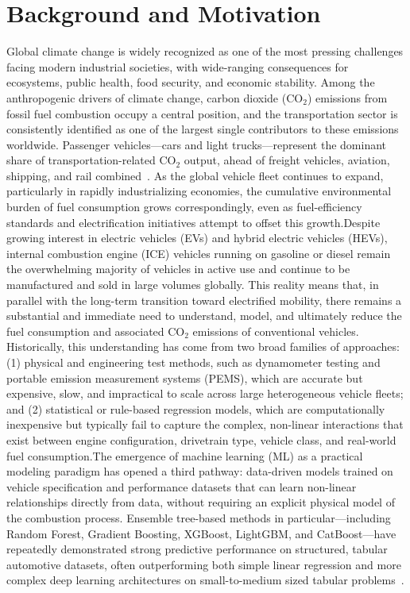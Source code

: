 \section{Background and Motivation}

Global climate change is widely recognized as one of the most pressing challenges facing modern industrial societies, with wide-ranging consequences for ecosystems, public health, food security, and economic stability. Among the anthropogenic drivers of climate change, carbon dioxide (CO$_2$) emissions from fossil fuel combustion occupy a central position, and the transportation sector is consistently identified as one of the largest single contributors to these emissions worldwide. Passenger vehicles---cars and light trucks---represent the dominant share of transportation-related CO$_2$ output, ahead of freight vehicles, aviation, shipping, and rail combined~\cite{atique2026explainable}. As the global vehicle fleet continues to expand, particularly in rapidly industrializing economies, the cumulative environmental burden of fuel consumption grows correspondingly, even as fuel-efficiency standards and electrification initiatives attempt to offset this growth.Despite growing interest in electric vehicles (EVs) and hybrid electric vehicles (HEVs), internal combustion engine (ICE) vehicles running on gasoline or diesel remain the overwhelming majority of vehicles in active use and continue to be manufactured and sold in large volumes globally. This reality means that, in parallel with the long-term transition toward electrified mobility, there remains a substantial and immediate need to understand, model, and ultimately reduce the fuel consumption and associated CO$_2$ emissions of conventional vehicles. Historically, this understanding has come from two broad families of approaches: (1) physical and engineering test methods, such as dynamometer testing and portable emission measurement systems (PEMS), which are accurate but expensive, slow, and impractical to scale across large heterogeneous vehicle fleets; and (2) statistical or rule-based regression models, which are computationally inexpensive but typically fail to capture the complex, non-linear interactions that exist between engine configuration, drivetrain type, vehicle class, and real-world fuel consumption.The emergence of machine learning (ML) as a practical modeling paradigm has opened a third pathway: data-driven models trained on vehicle specification and performance datasets that can learn non-linear relationships directly from data, without requiring an explicit physical model of the combustion process. Ensemble tree-based methods in particular---including Random Forest, Gradient Boosting, XGBoost, LightGBM, and CatBoost---have repeatedly demonstrated strong predictive performance on structured, tabular automotive datasets, often outperforming both simple linear regression and more complex deep learning architectures on small-to-medium sized tabular problems~\cite{atique2026explainable}.
